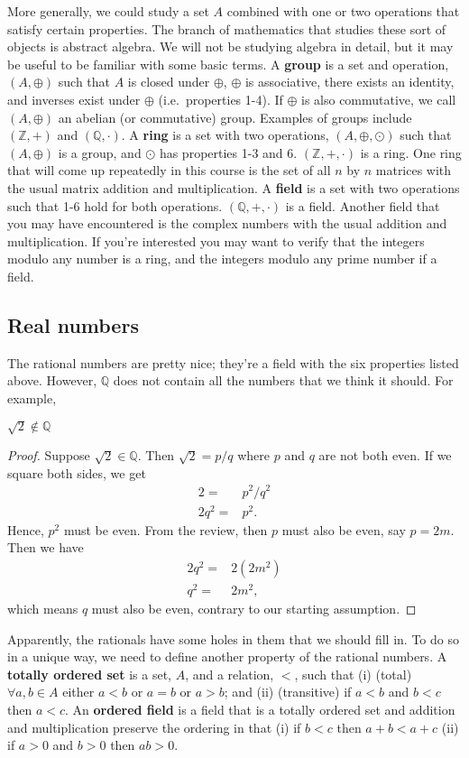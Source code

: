 More generally, we could study a set $A$ combined with one or two
operations that satisfy certain properties. The branch of mathematics
that studies these sort of objects is abstract algebra. We will not be
studying algebra in detail, but it may be useful to be familiar with
some basic terms. A \textbf{group} is a set and operation,
$(A,\oplus)$ such that $A$ is closed under $\oplus$, $\oplus$ is
associative, there exists an identity, and inverses exist under
$\oplus$ (i.e.\ properties 1-4). If $\oplus$ is also commutative, we
call $(A,\oplus)$ an abelian (or commutative) group. Examples of
groups include $(\mathbb{Z},+)$ and $(\mathbb{Q},\cdot)$. A
\textbf{ring} is a set with two operations, $(A,\oplus,\odot)$ such
that $(A,\oplus)$ is a group, and $\odot$ has properties 1-3 and
6. $(\mathbb{Z},+,\cdot)$ is a ring.  One ring that will come up
repeatedly in this course is the set of all $n$ by $n$ matrices with
the usual matrix addition and multiplication. A \textbf{field} is a set
with two operations such that 1-6 hold for both
operations. $(\mathbb{Q},+,\cdot)$ is a field. Another field that you
may have encountered is the complex numbers with the usual addition
and multiplication. If you're interested you may want to verify that
the integers modulo any number is a ring, and the integers modulo any
prime number if a field.

\subsection{Real numbers}

The rational numbers are pretty nice; they're a field with the six
properties listed above. However, $\mathbb{Q}$ does not contain all
the numbers that we think it should. For example,
\begin{theorem}
  $\sqrt{2} \not\in \mathbb{Q}$
\end{theorem}
\begin{proof}
  Suppose $\sqrt{2} \in \mathbb{Q}$. Then $\sqrt{2} = p / q$ where $p$
  and $q$ are not both even. If we square both sides, we get
  \begin{align*}
    2 = & p^2 / q^2 \\
    2 q^2 = & p^2.
  \end{align*}
  Hence, $p^2$ must be even. From the review, then $p$ must also be
  even, say $p = 2m$. Then we have
  \begin{align*}
    2 q^2 = & 2(2 m^2) \\
    q^2 = & 2 m^2,
  \end{align*}
  which means $q$ must also be even, contrary to our starting
  assumption. 
\end{proof}
Apparently, the rationals have some holes in them that we should fill
in. To do so in a unique way, we need to define another property of
the rational numbers. A \textbf{totally ordered set} is a set, $A$,
and a relation, $<$, such that (i) (total) $\forall a,b \in A$ either
$a < b$ or $a = b$ or $a > b$; and (ii) (transitive) if $a < b$ and $b
< c$ then $a < c$. An \textbf{ordered field} is a field that is a
totally ordered set and addition and multiplication preserve the
ordering in that (i) if $b<c$ then $a + b < a + c$ (ii) if $a>0$ and
$b>0$ then $ab>0$.

